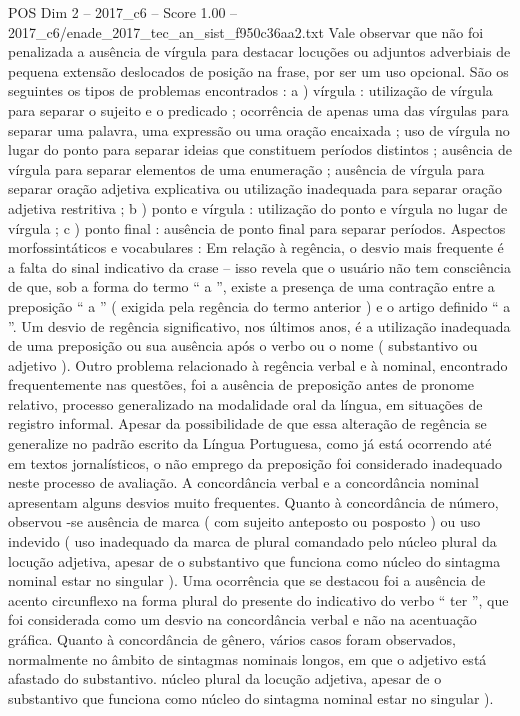 \begin{textsample}{POS Dim 2 – 2017\_c6 – Score 1.00 – 2017\_c6/enade\_2017\_tec\_an\_sist\_f950c36aa2.txt}
Vale observar que não foi penalizada a ausência de vírgula para destacar locuções ou adjuntos adverbiais de pequena extensão deslocados de posição na frase, por ser um uso opcional.
São os seguintes os tipos de problemas encontrados : a ) vírgula : utilização de vírgula para separar o sujeito e o predicado ; ocorrência de apenas uma das vírgulas para separar uma palavra, uma expressão ou uma oração encaixada ; uso de vírgula no lugar do ponto para separar ideias que constituem períodos distintos ; ausência de vírgula para separar elementos de uma enumeração ; ausência de vírgula para separar oração adjetiva explicativa ou utilização inadequada para separar oração adjetiva restritiva ; b ) ponto e vírgula : utilização do ponto e vírgula no lugar de vírgula ; c ) ponto final : ausência de ponto final para separar períodos.
Aspectos morfossintáticos e vocabulares : Em relação à regência, o desvio mais frequente é a falta do sinal indicativo da crase – isso revela que o usuário não tem consciência de que, sob a forma do termo “ a ”, existe a presença de uma contração entre a preposição “ a ” ( exigida pela regência do termo anterior ) e o artigo definido “ a ”.
Um desvio de regência significativo, nos últimos anos, é a utilização inadequada de uma preposição ou sua ausência após o verbo ou o nome ( substantivo ou adjetivo ).
Outro problema relacionado à regência verbal e à nominal, encontrado frequentemente nas questões, foi a ausência de preposição antes de pronome relativo, processo generalizado na modalidade oral da língua, em situações de registro informal.
Apesar da possibilidade de que essa alteração de regência se generalize no padrão escrito da Língua Portuguesa, como já está ocorrendo até em textos jornalísticos, o não emprego da preposição foi considerado inadequado neste processo de avaliação.
A concordância verbal e a concordância nominal apresentam alguns desvios muito frequentes.
Quanto à concordância de número, observou -se ausência de marca ( com sujeito anteposto ou posposto ) ou uso indevido ( uso inadequado da marca de plural comandado pelo núcleo plural da locução adjetiva, apesar de o substantivo que funciona como núcleo do sintagma nominal estar no singular ).
Uma ocorrência que se destacou foi a ausência de acento circunflexo na forma plural do presente do indicativo do verbo “ ter ”, que foi considerada como um desvio na concordância verbal e não na acentuação gráfica.
Quanto à concordância de gênero, vários casos foram observados, normalmente no âmbito de sintagmas nominais longos, em que o adjetivo está afastado do substantivo. núcleo plural da locução adjetiva, apesar de o substantivo que funciona como núcleo do sintagma nominal estar no singular ).

\end{textsample}
